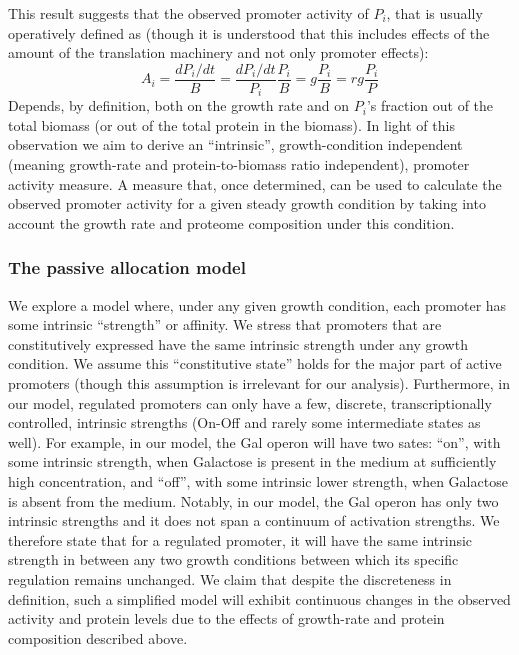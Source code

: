 \documentclass[a4page,notitlepage]{article}
\begin{document}
This result suggests that the observed promoter activity of $P_i$, that is usually operatively defined as (though it is understood that this includes effects of the amount of the translation machinery and not only promoter effects):
\begin{equation}
\label{pa-gr-relation}
A_i=\frac{dP_i/dt}{B}=\frac{dP_i/dt}{P_i}\frac{P_i}{B}=g\frac{P_i}{B}=rg\frac{P_i}{P}
\end{equation}
Depends, by definition, both on the growth rate and on $P_i$’s fraction out of the total biomass (or out of the total protein in the biomass).
In light of this observation we aim to derive an “intrinsic”, growth-condition independent (meaning growth-rate and protein-to-biomass ratio independent), promoter activity measure.
A measure that, once determined, can be used to calculate the observed promoter activity for a given steady growth condition by taking into account the growth rate and proteome composition under this condition.
\subsubsection{The passive allocation model}
We explore a model where, under any given growth condition, each promoter has some intrinsic ``strength'' or affinity.
We stress that promoters that are constitutively expressed have the same intrinsic strength under any growth condition.
We assume this ``constitutive state'' holds for the major part of active promoters (though this assumption is irrelevant for our analysis).
Furthermore, in our model, regulated promoters can only have a few, discrete, transcriptionally controlled, intrinsic strengths (On-Off and rarely some intermediate states as well).
For example, in our model, the Gal operon will have two sates: ``on'', with some intrinsic strength, when Galactose is present in the medium at sufficiently high concentration, and ``off'', with some intrinsic lower strength, when Galactose is absent from the medium.
Notably, in our model, the Gal operon has only two intrinsic strengths and it does not span a continuum of activation strengths.
We therefore state that for a regulated promoter, it will have the same intrinsic strength in between any two growth conditions between which its specific regulation remains unchanged.
We claim that despite the discreteness in definition, such a simplified model will exhibit continuous changes in the observed activity and protein levels due to the effects of growth-rate and protein composition described above.
\end{document}
